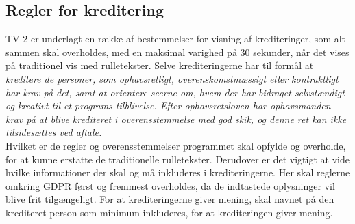 \subsection{Regler for kreditering}


TV 2 er underlagt en række af bestemmelser for visning af krediteringer, som alt sammen skal overholdes, med en maksimal varighed på 30 sekunder, når det vises på traditionel vis med rulletekster. Selve krediteringerne har til formål at \textit{kreditere de personer, som ophavsretligt, overenskomstmæssigt eller kontraktligt har krav på det, samt at orientere seerne om, hvem der har bidraget selvstændigt og kreativt til et programs tilblivelse. Efter ophavsretsloven har ophavsmanden krav på at blive krediteret i overensstemmelse med god skik, og denne ret kan ikke tilsidesættes ved aftale.}\cite{url_kredit_regler} \\
Hvilket er de regler og overensstemmelser programmet skal opfylde og overholde, for at kunne erstatte de traditionelle rulletekster. Derudover er det vigtigt at vide hvilke informationer der skal og må inkluderes i krediteringerne. Her skal reglerne omkring GDPR først og fremmest overholdes, da de indtastede oplysninger vil blive frit tilgængeligt. For at krediteringerne giver mening, skal navnet på den krediteret person som minimum inkluderes, for at krediteringen giver mening. 

